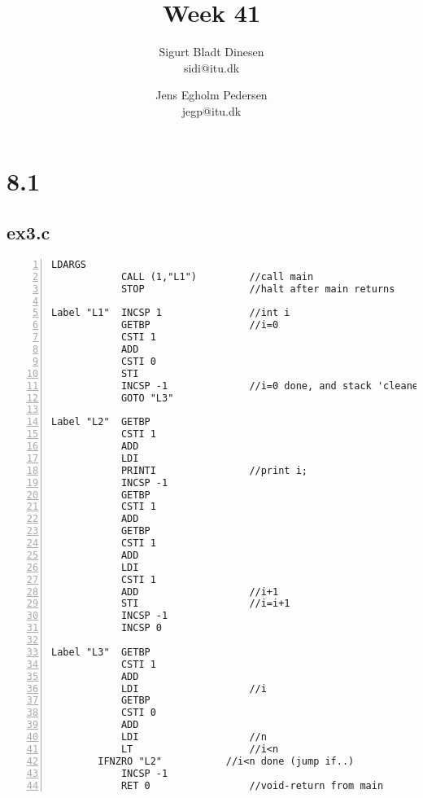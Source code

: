 \documentclass[a4paper, titlepage]{article}
\begin{document}
\title{Week 41}
\author{Sigurt Bladt Dinesen \\sidi{@}itu.dk \and Jens Egholm Pedersen \\jegp{@}itu.dk}
\maketitle
\section*{8.1}
\subsection*{ex3.c}
\begin{lstlisting}[numbers=left]
            LDARGS
            CALL (1,"L1")         //call main
            STOP                  //halt after main returns

Label "L1"  INCSP 1               //int i
            GETBP                 //i=0
            CSTI 1
            ADD
            CSTI 0
            STI
            INCSP -1              //i=0 done, and stack 'cleaned'
            GOTO "L3"

Label "L2"  GETBP
            CSTI 1
            ADD
            LDI
            PRINTI                //print i;
            INCSP -1
            GETBP
            CSTI 1
            ADD
            GETBP
            CSTI 1
            ADD
            LDI
            CSTI 1
            ADD                   //i+1
            STI                   //i=i+1
            INCSP -1
            INCSP 0

Label "L3"  GETBP
            CSTI 1
            ADD
            LDI                   //i
            GETBP
            CSTI 0
            ADD
            LDI                   //n
            LT                    //i<n
	    IFNZRO "L2"           //i<n done (jump if..)
            INCSP -1
            RET 0                 //void-return from main
\end{lstlisting}
\end{document}
